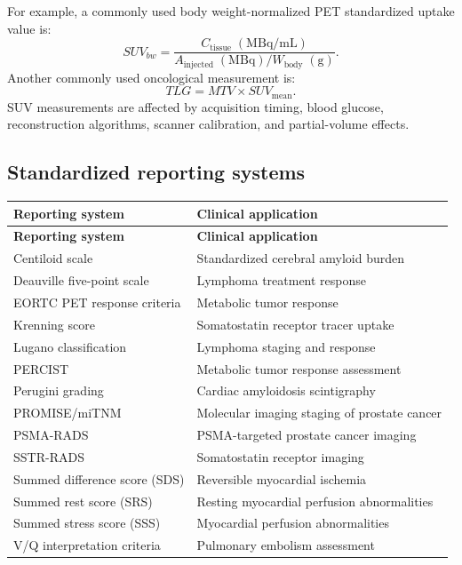For example, a commonly used body weight-normalized PET standardized uptake value is:
\begin{equation}
SUV_{bw}=\frac{C_{\text{tissue}}\;(\mathrm{MBq/mL})}{A_{\text{injected}}\;(\mathrm{MBq})/W_{\text{body}}\;(\mathrm{g})}.
\end{equation}
Another commonly used oncological measurement is:
\begin{equation}
TLG=MTV\times SUV_{\text{mean}}.
\end{equation}
SUV measurements are affected by acquisition timing, blood glucose, reconstruction algorithms, scanner calibration, and partial-volume effects.

\subsection{Standardized reporting systems}
\begin{longtable}{@{}p{}p{}@{}}
\toprule
\textbf{Reporting system} & \textbf{Clinical application} \\
\midrule
\endfirsthead
\toprule
\textbf{Reporting system} & \textbf{Clinical application} \\
\midrule
\endhead
Centiloid scale & Standardized cerebral amyloid burden \\
Deauville five-point scale & Lymphoma treatment response \\
EORTC PET response criteria & Metabolic tumor response \\
Krenning score & Somatostatin receptor tracer uptake \\
Lugano classification & Lymphoma staging and response \\
PERCIST & Metabolic tumor response assessment \\
Perugini grading & Cardiac amyloidosis scintigraphy \\
PROMISE/miTNM & Molecular imaging staging of prostate cancer \\
PSMA-RADS & PSMA-targeted prostate cancer imaging \\
SSTR-RADS & Somatostatin receptor imaging \\
Summed difference score (SDS) & Reversible myocardial ischemia \\
Summed rest score (SRS) & Resting myocardial perfusion abnormalities \\
Summed stress score (SSS) & Myocardial perfusion abnormalities \\
V/Q interpretation criteria & Pulmonary embolism assessment \\
\bottomrule
\end{longtable}

